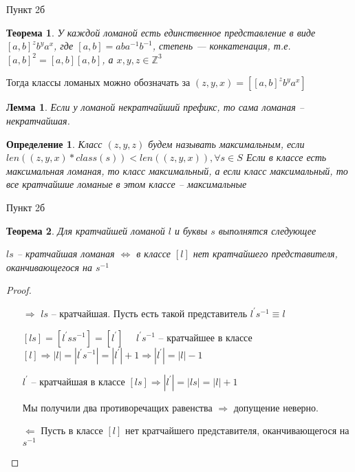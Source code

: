 \documentclass[serif, ucs]{beamer}
\newtheorem{Def}{Определение}[section]
\newtheorem{Th}{Теорема}[section]
\newtheorem{Lm}{Лемма}[section]
\newcommand{\p}[1]{#1^{\prime}}
\begin{document}
\begin{frame}{Пункт 2б}
\begin{footnotesize}
\begin{Th}
	У каждой ломаной есть единственное представление в виде $[a, b]^zb^ya^x$, где $[a, b] = aba^{-1}b^{-1}$, степень --- конкатенация, т.е. $[a, b]^2 = [a, b][a, b]$, а $x, y, z\in\mathds{Z}^3$
\end{Th}

Тогда классы ломаных можно обозначать за $(z, y, x) = [[a, b]^zb^ya^x]$

\begin{Lm}
	Если у ломаной некратчайший префикс, то сама ломаная -- некратчайшая.
\end{Lm}
\begin{Def}
	Класс $(z, y, z)$ будем называть максимальным, если $len((z, y, x)*class(s))<len((z, y, x)) , \forall s\in S$
	Если в классе есть максимальная ломаная, то класс максимальный, а если класс максимальный, то все кратчайшие ломаные в этом классе -- максимальные
\end{Def}
\end{footnotesize}
\end{frame}
\begin{frame}{Пункт 2б}
\begin{footnotesize}
\begin{Th}
	Для кратчайшей ломаной $l$ и буквы $s$ выполнятся следующее 
	
	$ls$ -- кратчайшая ломаная $\Longleftrightarrow$ в классе $[l]$ нет кратчайшего представителя, оканчивающегося на $s^{-1}$ 
\end{Th}
\begin{proof}
	\begin{itemize}
		\item[$\Rightarrow$] $ls$ -- кратчайшая. Пусть есть такой представитель $\p ls^{-1}\equiv l$
		
		$[ls] = [\p l s s^{-1}] = [\p l]$ $\quad \p ls^{-1}$ -- кратчайшее в классе $[l]\Rightarrow |l|=|\p l s^{-1}| = |\p l| + 1\Rightarrow |\p l| = |l|-1$
		
		$\p l$ -- кратчайшая в классе $[ls]\Rightarrow |\p l | = |ls| = |l| + 1$
		
		Мы получили два противоречащих равенства $\Rightarrow $ допущение неверно.
		\item[$\Leftarrow$] Пусть в классе $[l]$ нет кратчайшего представителя, оканчивающегося на $s^{-1}$
	\end{itemize}
\end{proof}
\end{footnotesize}
\end{frame}
\end{document}
